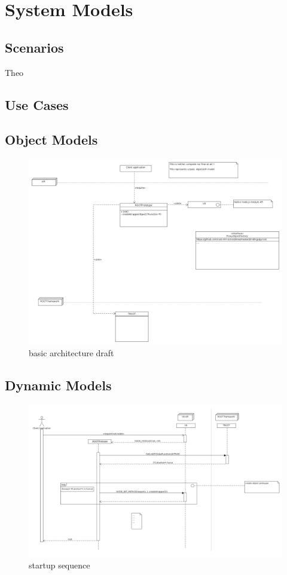 \chapter{System Models}

\section{Scenarios}
Theo

\section{Use Cases}

\pagebreak[4]

\section{Object Models}
\begin{figure}[htb]
	\centering
	\includegraphics[width=15cm]{./latex/resources/architecture.png}
	\caption{basic architecture draft}
\end{figure}

\pagebreak[4]

\section{Dynamic Models}
\begin{figure}[htb]
	\centering
	\includegraphics[width=15cm]{./latex/resources/startupSequence.png}
	\caption{startup sequence}
\end{figure}